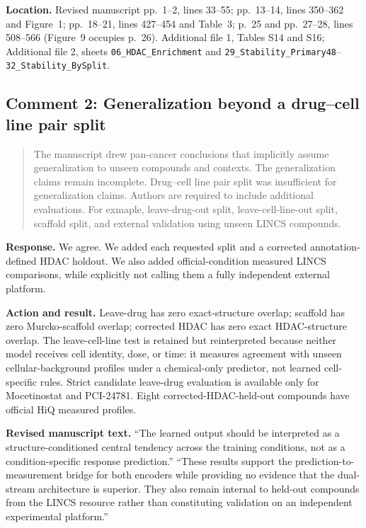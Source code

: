 \documentclass[10pt]{article}
\newenvironment{reviewcomment}{%
  \begin{quote}\small\itshape\color{black}
}{\end{quote}}
\newcommand{\Response}{\textbf{Response.} }
\newcommand{\Action}{\textbf{Action and result.} }
\newcommand{\RevisedText}{\textbf{Revised manuscript text.} }
\newcommand{\Location}{\textbf{Location.} }
\newcommand{\qtext}[1]{``#1''}
\begin{document}
\Location Revised manuscript pp.~1--2, lines 33--55; pp.~13--14, lines 350--362 and Figure~1; pp.~18--21, lines 427--454 and Table~3; p.~25 and pp.~27--28, lines 508--566 (Figure~9 occupies p.~26). Additional file 1, Tables S14 and S16; Additional file 2, sheets \texttt{06\_HDAC\_Enrichment} and \texttt{29\_Stability\_Primary48}--\texttt{32\_Stability\_BySplit}.

\subsection*{Comment 2: Generalization beyond a drug--cell line pair split}
\begin{reviewcomment}
The manuscript drew pan-cancer conclusions that implicitly assume generalization to unseen compounds and contexts. The generalization claims remain incomplete. Drug–cell line pair split was insufficient for generalization claims. Authors are required to include additional evaluations. For exmaple, leave-drug-out split, leave-cell-line-out split, scaffold split, and external validation using unseen LINCS compounds.
\end{reviewcomment}

\Response We agree. We added each requested split and a corrected annotation-defined HDAC holdout. We also added official-condition measured LINCS comparisons, while explicitly not calling them a fully independent external platform.

\Action Leave-drug has zero exact-structure overlap; scaffold has zero Murcko-scaffold overlap; corrected HDAC has zero exact HDAC-structure overlap. The leave-cell-line test is retained but reinterpreted because neither model receives cell identity, dose, or time: it measures agreement with unseen cellular-background profiles under a chemical-only predictor, not learned cell-specific rules. Strict candidate leave-drug evaluation is available only for Mocetinostat and PCI-24781. Eight corrected-HDAC-held-out compounds have official HiQ measured profiles.

\RevisedText \qtext{The learned output should be interpreted as a structure-conditioned central tendency across the training conditions, not as a condition-specific response prediction.} \qtext{These results support the prediction-to-measurement bridge for both encoders while providing no evidence that the dual-stream architecture is superior. They also remain internal to held-out compounds from the LINCS resource rather than constituting validation on an independent experimental platform.}
\end{document}
